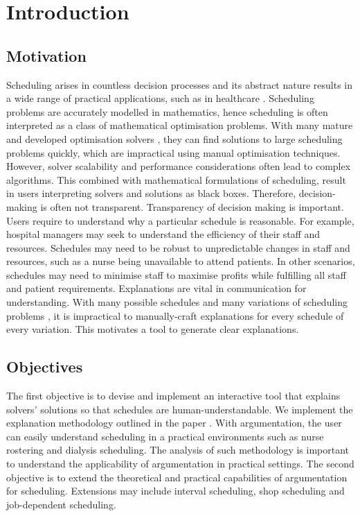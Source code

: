 \chapter{Introduction}
	
\section{Motivation}

Scheduling arises in countless decision processes and its abstract nature results in a wide range of practical applications, such as in healthcare \cite{sanr,operations}. Scheduling problems are accurately modelled in mathematics, hence scheduling is often interpreted as a class of mathematical optimisation problems. With many mature and developed optimisation solvers \cite{clp}, they can find solutions to large scheduling problems quickly, which are impractical using manual optimisation techniques. However, solver scalability and performance considerations often lead to complex algorithms. This combined with mathematical formulations of scheduling, result in users interpreting solvers and solutions as black boxes. Therefore, decision-making is often not transparent.
\linespace
Transparency of decision making is important. Users require to understand why a particular schedule is reasonable. For example, hospital managers may seek to understand the efficiency of their staff and resources. Schedules may need to be robust to unpredictable changes in staff and resources, such as a nurse being unavailable to attend patients. In other scenarios, schedules may need to minimise staff to maximise profits while fulfilling all staff and patient requirements.
\linespace
Explanations are vital in communication for understanding. With many possible schedules and many variations of scheduling problems \cite{sta}, it is impractical to manually-craft explanations for every schedule of every variation. This motivates a tool to generate clear explanations.

\section{Objectives}
\label{objectives}

The first objective is to devise and implement an interactive tool that explains solvers' solutions so that schedules are human-understandable. We implement the explanation methodology outlined in the paper \cite{aes}. With argumentation, the user can easily understand scheduling in a practical environments such as nurse rostering and dialysis scheduling. The analysis of such methodology is important to understand the applicability of argumentation in practical settings.
\linespace
The second objective is to extend the theoretical and practical capabilities of argumentation for scheduling. Extensions may include interval scheduling, shop scheduling and job-dependent scheduling.

